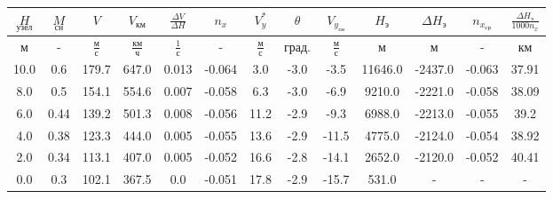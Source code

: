 \begin{tabular}{|c|c|c|c|c|c|c|c|c|c|c|c|c|}
\hline
$\underset{узел}{H}$ & $\underset{сн}{M}$ & $V$ & $V_{км}$ & $\frac{\Delta V}{\Delta H}$ & $n_x$ & $V_{y}^*$ & $\theta$ & $V_{y_{сн}}$ & $H_э$ & $\Delta H_э$ & $n_{x_{ср}}$ & $\frac{\Delta H_{э}}{1000 n_x}$ \\ 
\hline
м & - & $\frac{м}{с}$ & $\frac{км}{ч}$ & $\frac{1}{с}$ & - & $\frac{м}{с}$ & $град.$ & $\frac{м}{с}$ & м & м & - & км \\ 
\hline
10.0 & 0.6 & 179.7 & 647.0 & 0.013 & -0.064 & 3.0 & -3.0 & -3.5 & 11646.0 & -2437.0 & -0.063 & 37.91 \\ 
\hline
8.0 & 0.5 & 154.1 & 554.6 & 0.007 & -0.058 & 6.3 & -3.0 & -6.9 & 9210.0 & -2221.0 & -0.058 & 38.09 \\ 
\hline
6.0 & 0.44 & 139.2 & 501.3 & 0.008 & -0.056 & 11.2 & -2.9 & -9.3 & 6988.0 & -2213.0 & -0.055 & 39.2 \\ 
\hline
4.0 & 0.38 & 123.3 & 444.0 & 0.005 & -0.055 & 13.6 & -2.9 & -11.5 & 4775.0 & -2124.0 & -0.054 & 38.92 \\ 
\hline
2.0 & 0.34 & 113.1 & 407.0 & 0.005 & -0.052 & 16.6 & -2.8 & -14.1 & 2652.0 & -2120.0 & -0.052 & 40.41 \\ 
\hline
0.0 & 0.3 & 102.1 & 367.5 & 0.0 & -0.051 & 17.8 & -2.9 & -15.7 & 531.0 & - & - & - \\ 
\hline
\end{tabular}